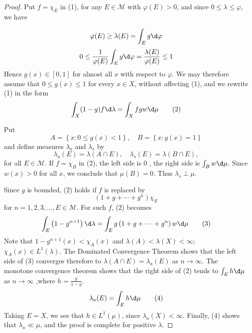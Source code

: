 \documentclass[12pt, a4paper, oneside]{book}
\begin{document}
\begin{theorem}
\begin{proof}
        Put $f=\chi_{E}$ in (1), for any $E \in \mathcal{M}$ with $\varphi(E)>0$, and since $0 \leq \lambda \leq \varphi$, we have

        $$
            \varphi (E) \geq \lambda(E) =  \int_E g \d  \varphi
        $$
        $$
            0 \leq \frac{1}{\varphi(E)} \int_E g \d  \varphi=\frac{\lambda(E)}{\varphi(E)} \leq 1
        $$
        Hence $g(x) \in[0,1]$ for almost all $x$ with respect to $\varphi$. We may therefore assume that $0 \leq g(x) \leq 1$ for every $x \in X$, without affecting (1), and we rewrite (1) in the form
        \begin{equation}
            \int_X (1-g) f \d  \lambda=\int_X f g w \d  \mu \tag{2}
        \end{equation}

        Put
        $$
            A=\left\{x: 0 \leq g(x)<1\right\}, \quad B=\left\{x: g(x)=1\right\}
        $$
        and define measures $\lambda_a$ and $\lambda_s$ by
        $$
            \lambda_a (E)=\lambda(A \cap E), \quad \lambda_{s}(E)=\lambda(B \cap E),
        $$
        for all $E \in \mathcal{M}$.
        If $f=\chi_B$ in (2), the left side is 0 , the right side is $\int_B w \d  \mu$. Since $w(x)>0$ for all $x$, we conclude that $\mu(B)=0$. Thus $\lambda_s \perp \mu$.

        Since $g$ is bounded, (2) holds if $f$ is replaced by
        $$
            \left(1+g+\cdots+g^n\right) \chi_E
        $$
        for $n=1,2,3, \ldots, E \in \mathcal{M}$. For such $f$, (2) becomes
        \begin{equation}
            \int_E\left(1-g^{n+1}\right) \d  \lambda=\int_E g\left(1+g+\cdots+g^n\right) w \d  \mu \tag{3}
        \end{equation}
        Note that $1- g^{n+1}(x) < \chi_{A}(x)$ and $\lambda(A) < \lambda (X) < \infty$; $\chi_A(x) \in L^1 (\lambda)$. The Dominated Convergence Theorem shows that the left side of (3) converges therefore to $\lambda(A \cap E)=\lambda_a(E)$ as $n \rightarrow \infty$. The monotone convergence theorem shows that the right side of (2) tends to $\int_E h \d  \mu$ as $n \rightarrow \infty$ ,where $h=\frac{g}{1-g}$.
        \begin{equation}
            \lambda_a(E)=\int_E h \d  \mu \tag{4}
        \end{equation}
        Taking $E=X$, we see that $h \in L^1(\mu)$, since $\lambda_a (X)<\infty$. Finally, (4) shows that $\lambda_a \ll \mu$, and the proof is complete for positive $\lambda$.


\end{proof}
\end{theorem}
\end{document}
